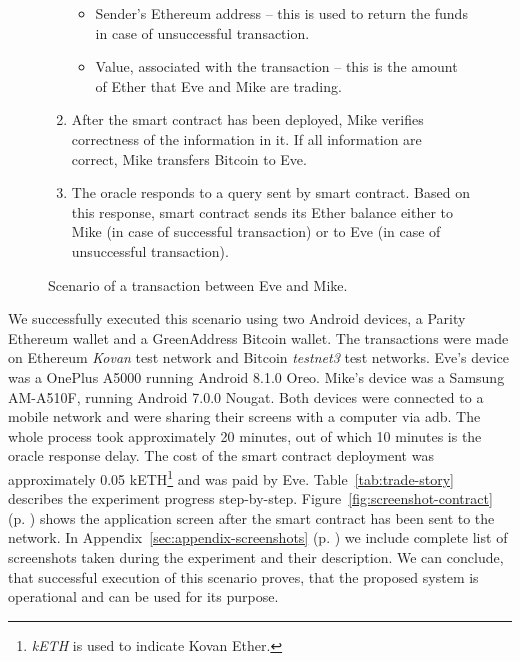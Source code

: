 \begin{figure}[ht]
\begin{framed}
\begin{enumerate}[noitemsep]
            \begin{itemize}[nolistsep,noitemsep]
                \item Sender's Ethereum address -- this is used to return the funds in case of unsuccessful transaction.
                \item Value, associated with the transaction -- this is the amount of Ether that Eve and Mike are trading.
            \end{itemize}
        \item After the smart contract has been deployed, Mike verifies correctness of the information in it. If all information are correct, Mike transfers Bitcoin to Eve.
        \item The oracle responds to a query sent by smart contract. Based on this response, smart contract sends its Ether balance either to Mike (in case of successful transaction) or to Eve (in case of unsuccessful transaction).
    \end{enumerate}
    \end{framed}
    \caption{Scenario of a transaction between Eve and Mike.}
    \label{fig:transaction-scenario}
\end{figure}

We successfully executed this scenario using two Android devices, a Parity Ethereum wallet and a GreenAddress Bitcoin wallet. The transactions were made on Ethereum \textit{Kovan} test network and Bitcoin \textit{testnet3} test networks. Eve's device was a OnePlus A5000 running Android 8.1.0 Oreo. Mike's device was a Samsung AM-A510F, running Android 7.0.0 Nougat. Both devices were connected to a mobile network and were sharing their screens with a computer via \acrshort{adb}. The whole process took approximately 20 minutes, out of which 10 minutes is the oracle response delay. The cost of the smart contract deployment was approximately 0.05 kETH\footnote{\textit{kETH} is used to indicate Kovan Ether.} and was paid by Eve\footnotemark. Table~\ref{tab:trade-story} describes the experiment progress step-by-step. Figure~\ref{fig:screenshot-contract} (p. \pageref{fig:screenshot-contract}) shows the application screen after the smart contract has been sent to the network. In Appendix~\ref{sec:appendix-screenshots} (p. \pageref{sec:appendix-screenshots}) we include complete list of screenshots taken during the experiment and their description. We can conclude, that successful execution of this scenario proves, that the proposed system is operational and can be used for its purpose.
% 

